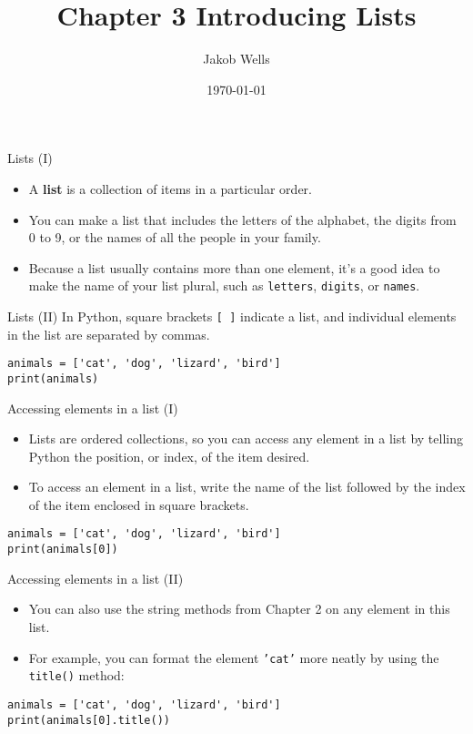 \documentclass[aspectratio=169]{beamer}
\title{Chapter 3 Introducing Lists}
\author{Jakob Wells}
\begin{document}
\date{\today}


\begin{frame}
    \titlepage{}
\end{frame}


\begin{frame}[fragile]{Lists (I)}
    \begin{itemize}[label=--,itemsep=15pt]
        \item A \textbf{list} is a collection of items in a particular order.
        \item You can make a list that includes the letters of the alphabet, the digits from 0 to 9, or the names of all the people in your family.
        \item Because a list usually contains more than one element, it's a good idea to make the name of your list plural, such as \texttt{letters}, \texttt{digits}, or \texttt{names}.
    \end{itemize}
\end{frame}


\begin{frame}[fragile]{Lists (II)}
    In Python, square brackets \texttt{[ ]} indicate a list, and individual elements in the list are separated by commas.
    \vspace{15pt}
    \begin{verbatim}
animals = ['cat', 'dog', 'lizard', 'bird']
print(animals)
    \end{verbatim}
\end{frame}


\begin{frame}[fragile]{Accessing elements in a list (I)}
    \begin{itemize}[label=--,itemsep=15pt]
        \item Lists are ordered collections, so you can access any element in a list by telling Python the position, or index, of the item desired.
        \item To access an element in a list, write the name of the list followed by the index of the item enclosed in square brackets.
    \end{itemize}
    \vspace{15pt}
    \begin{verbatim}
animals = ['cat', 'dog', 'lizard', 'bird']
print(animals[0])
    \end{verbatim}
\end{frame}


\begin{frame}[fragile]{Accessing elements in a list (II)}
    \begin{itemize}[label=--,itemsep=15pt]
        \item You can also use the string methods from Chapter 2 on any element in this list.
        \item For example, you can format the element \texttt{'cat'} more neatly by using the \texttt{title()} method:
    \end{itemize}
    \vspace{15pt}
    \begin{verbatim}
animals = ['cat', 'dog', 'lizard', 'bird']
print(animals[0].title())
    \end{verbatim}
\end{frame}
\end{document}
